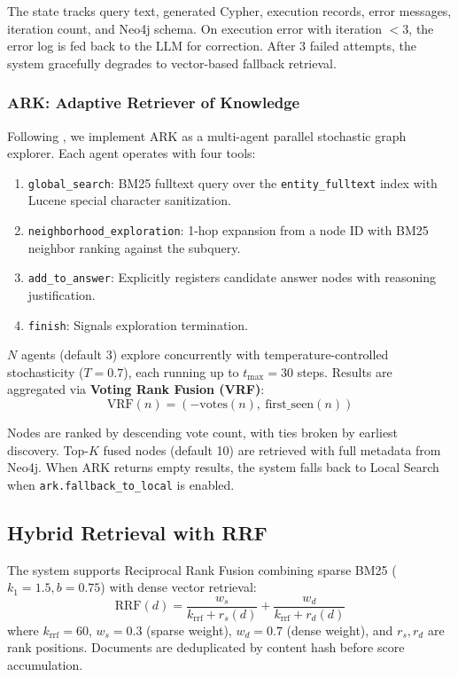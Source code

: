 \documentclass[11pt]{article}
\begin{document}
The state tracks query text, generated Cypher, execution records, error messages, iteration count, and Neo4j schema. On execution error with iteration $< 3$, the error log is fed back to the LLM for correction. After 3 failed attempts, the system gracefully degrades to vector-based fallback retrieval.

\subsubsection{ARK: Adaptive Retriever of Knowledge}

Following \citet{polonuer2026ark}, we implement ARK as a multi-agent parallel stochastic graph explorer. Each agent operates with four tools:

\begin{enumerate}[leftmargin=*]
    \item \texttt{global\_search}: BM25 fulltext query over the \texttt{entity\_fulltext} index with Lucene special character sanitization.
    \item \texttt{neighborhood\_exploration}: 1-hop expansion from a node ID with BM25 neighbor ranking against the subquery.
    \item \texttt{add\_to\_answer}: Explicitly registers candidate answer nodes with reasoning justification.
    \item \texttt{finish}: Signals exploration termination.
\end{enumerate}

$N$ agents (default 3) explore concurrently with temperature-controlled stochasticity ($T = 0.7$), each running up to $t_{\max} = 30$ steps. Results are aggregated via \textbf{Voting Rank Fusion (VRF)}:
\begin{equation}
\text{VRF}(n) = \left(-\text{votes}(n),\ \text{first\_seen}(n)\right)
\end{equation}

Nodes are ranked by descending vote count, with ties broken by earliest discovery. Top-$K$ fused nodes (default 10) are retrieved with full metadata from Neo4j. When ARK returns empty results, the system falls back to Local Search when \texttt{ark.fallback\_to\_local} is enabled.

\subsection{Hybrid Retrieval with RRF}

The system supports Reciprocal Rank Fusion \citep{cormack2009rrf} combining sparse BM25 ($k_1 = 1.5, b = 0.75$) with dense vector retrieval:
\begin{equation}
\text{RRF}(d) = \frac{w_s}{k_{\text{rrf}} + r_s(d)} + \frac{w_d}{k_{\text{rrf}} + r_d(d)}
\end{equation}
where $k_{\text{rrf}} = 60$, $w_s = 0.3$ (sparse weight), $w_d = 0.7$ (dense weight), and $r_s, r_d$ are rank positions. Documents are deduplicated by content hash before score accumulation.
\end{document}
